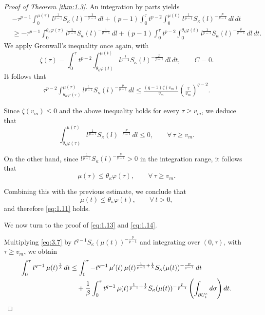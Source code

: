 \documentclass[11pt]{article}
\numberwithin{equation}{section}
\theoremstyle{definition}
\theoremstyle{remark}
\begin{document}
\begin{proof}[Proof of Theorem \ref{thm:1.3}]
An integration by parts yields
\begin{align*}
&-\tau^{p-1}\int_0^{\mu(\tau)} l^{\frac{1}{p-1}} S_\kappa(l)^{-\frac{1}{p-1}}\,dl
+ (p-1)\int_0^\tau t^{p-2}\int_0^{\mu(t)} l^{\frac{1}{p-1}} S_\kappa(l)^{-\frac{p}{p-1}}\,dl\,dt \\
&\ge
-\tau^{p-1}\int_0^{\theta_\kappa \varphi(\tau)} l^{\frac{1}{p-1}} S_\kappa(l)^{-\frac{1}{p-1}}\,dl
+ (p-1)\int_0^\tau t^{p-2}\int_0^{\theta_\kappa \varphi(t)} l^{\frac{1}{p-1}} {S}_\kappa(l)^{-\frac{p}{p-1}}\,dl\,dt.
\end{align*}
We apply Gronwall's inequality once again, with
\[
\zeta(\tau)
=
\int_0^\tau t^{p-2}
\int_{\theta_\kappa \varphi(t)}^{\mu(t)}
l^{\frac{1}{p-1}} S_\kappa(l)^{-\frac{p}{p-1}}\,dl\,dt,
\qquad C=0.
\]
It follows that
\begin{align*}
\tau^{p-2}
\int_{\theta_\kappa \varphi(\tau)}^{\mu(\tau)}
l^{\frac{1}{p-1}} S_\kappa(l)^{-\frac{p}{p-1}}\,dl
\le
\frac{(q-1)\zeta(v_m)}{v_m}
\left(\frac{\tau}{v_m}\right)^{q-2}.
\end{align*}

Since $\zeta(v_m)\le 0$ and the above inequality holds for every $\tau \ge v_m$, we deduce that
\[
\int_{\theta_\kappa \varphi(\tau)}^{\mu(\tau)}
l^{\frac{1}{p-1}} S_\kappa(l)^{-\frac{p}{p-1}}\,dl
\le 0,
\qquad \forall\, \tau \ge v_m.
\]

On the other hand, since
$l^{\frac{1}{p-1}} S_\kappa(l)^{-\frac{p}{p-1}} > 0$
in the integration range, it follows that
\[
\mu(\tau) \le \theta_\kappa \varphi(\tau),
\qquad \forall\, \tau \ge v_m.
\]

Combining this with the previous estimate, we conclude that
\[
\mu(t) \le \theta_\kappa \varphi(t), \qquad \forall\, t>0,
\]
and therefore \eqref{eq:1.11} holds.
\par
We now turn to the proof of \eqref{eq:1.13} and \eqref{eq:1.14}. 
\par
Multiplying \eqref{eq:3.7} by
$t^{q-1} S_\kappa(\mu(t))^{-\frac{p}{p-1}}$
and integrating over $(0,\tau)$, with $\tau \ge v_m$, we obtain
\begin{align*}
\int_0^\tau t^{q-1}\,\mu(t)^{\frac{1}{\lambda}}\,dt
&\le
\int_0^\tau -t^{q-1}\,\mu'(t)\,\mu(t)^{\frac{1}{p-1}+\frac{1}{\lambda}}S_\kappa(\mu(t))^{-\frac{p}{p-1}}\,dt
\notag\\
&\quad
+\frac{1}{\beta}
\int_0^\tau t^{q-1}\,\mu(t)^{\frac{1}{p-1}+\frac{1}{\lambda}}S_\kappa(\mu(t))^{-\frac{p}{p-1}}
\left(\int_{\partial U_t^e} d\sigma\right) dt.
\end{align*}


\end{proof}
\end{document}
